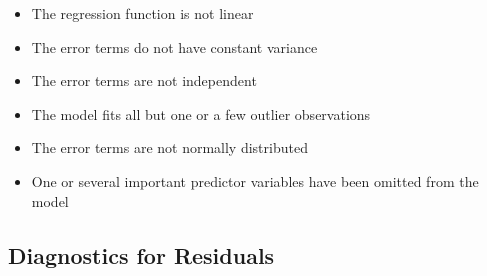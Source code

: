 \begin{itemize}
\begin{itemize}
\item The regression function is not linear 
\item The error terms do not have constant variance
\item The error terms are not independent 
\item The model fits all but one or a few outlier observations 
\item The error terms are not normally distributed 
\item One or several important predictor variables have been omitted from the model \end{itemize} 
\end{itemize} 

\subsection{Diagnostics for Residuals}
